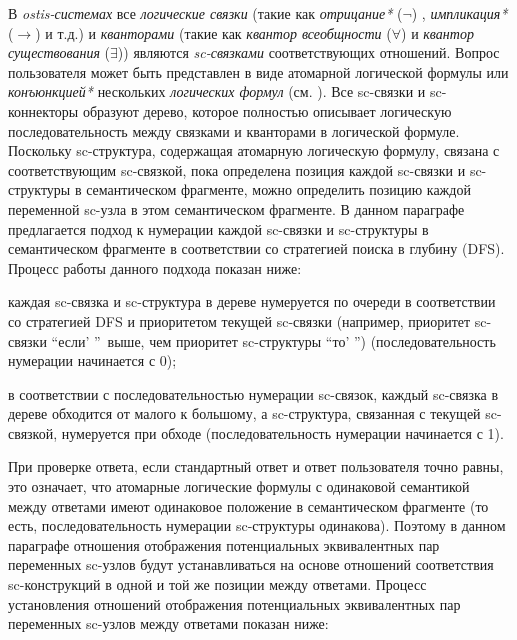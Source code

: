 В \textit{ostis-системах} все \textit{логические связки} (такие как \textit{отрицание*} ($\lnot$) , \textit{импликация*} ($\to$) и т.д.) и \textit{кванторами} (такие как \textit{квантор всеобщности} ($\forall$) и \textit{квантор существования} ($\exists$)) являются \textit{sc-связками} соответствующих отношений. Вопрос пользователя может быть представлен в виде атомарной логической формулы или \textit{конъюнкцией*} нескольких \textit{логических формул} (см. ). Все sc-связки и sc-коннекторы образуют дерево, которое полностью описывает логическую последовательность между связками и кванторами в логической формуле. Поскольку sc-структура, содержащая атомарную логическую формулу, связана с соответствующим sc-связкой, пока определена позиция каждой sc-связки и sc-структуры в семантическом фрагменте, можно определить позицию каждой переменной sc-узла в этом семантическом фрагменте. В данном параграфе предлагается подход к нумерации каждой sc-связки и sc-структуры в семантическом фрагменте в соответствии со стратегией поиска в глубину (DFS). Процесс работы данного подхода показан ниже:

\begin{textitemize}
    \item каждая sc-связка и sc-структура в дереве нумеруется по очереди в соответствии со стратегией DFS и приоритетом текущей sc-связки (например, приоритет sc-связки ``если' ''\ выше, чем приоритет sc-структуры ``то' '') (последовательность нумерации начинается с 0);
	\item в соответствии с последовательностью нумерации sc-связок, каждый sc-связка в дереве обходится от малого к большому, а sc-структура, связанная с текущей sc-связкой, нумеруется при обходе (последовательность нумерации начинается с 1).
\end{textitemize}

При проверке ответа, если стандартный ответ и ответ пользователя точно равны, это означает, что атомарные логические формулы с одинаковой семантикой между ответами имеют одинаковое положение в семантическом фрагменте (то есть, последовательность нумерации sc-структуры одинакова). Поэтому в данном параграфе отношения отображения потенциальных эквивалентных пар переменных sc-узлов будут устанавливаться на основе отношений соответствия sc-конструкций в одной и той же позиции между ответами. Процесс установления отношений отображения потенциальных эквивалентных пар переменных sc-узлов между ответами показан ниже:

